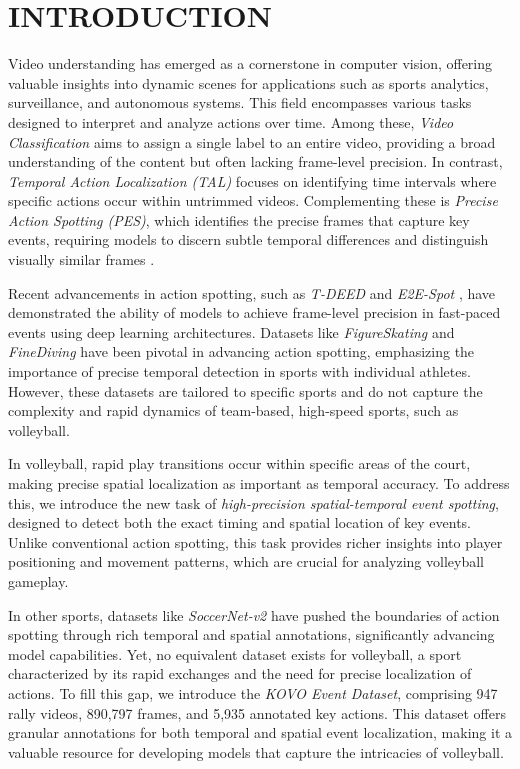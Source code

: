 \documentclass[a4paper,twoside]{article}
\begin{document}
\section{\uppercase{Introduction}}
\label{sec:introduction}
Video understanding has emerged as a cornerstone in computer vision, offering valuable insights into dynamic scenes for applications such as sports analytics, surveillance, and autonomous systems. This field encompasses various tasks designed to interpret and analyze actions over time. Among these, \textit{Video Classification} aims to assign a single label to an entire video, providing a broad understanding of the content but often lacking frame-level precision. In contrast, \textit{Temporal Action Localization (TAL)} focuses on identifying time intervals where specific actions occur within untrimmed videos. Complementing these is \textit{Precise Action Spotting (PES)}, which identifies the precise frames that capture key events, requiring models to discern subtle temporal differences and distinguish visually similar frames \cite{spot22}.

Recent advancements in action spotting, such as \textit{T-DEED} \cite{tdeed23} and \textit{E2E-Spot} \cite{spot22}, have demonstrated the ability of models to achieve frame-level precision in fast-paced events using deep learning architectures. Datasets like \textit{FigureSkating} \cite{figureskating} and \textit{FineDiving} \cite{finediving} have been pivotal in advancing action spotting, emphasizing the importance of precise temporal detection in sports with individual athletes. However, these datasets are tailored to specific sports and do not capture the complexity and rapid dynamics of team-based, high-speed sports, such as volleyball.

In volleyball, rapid play transitions occur within specific areas of the court, making precise spatial localization as important as temporal accuracy. To address this, we introduce the new task of \textit{high-precision spatial-temporal event spotting}, designed to detect both the exact timing and spatial location of key events. Unlike conventional action spotting, this task provides richer insights into player positioning and movement patterns, which are crucial for analyzing volleyball gameplay.

In other sports, datasets like \textit{SoccerNet-v2} \cite{soccernetv2} have pushed the boundaries of action spotting through rich temporal and spatial annotations, significantly advancing model capabilities. Yet, no equivalent dataset exists for volleyball, a sport characterized by its rapid exchanges and the need for precise localization of actions. To fill this gap, we introduce the \textit{KOVO Event Dataset}, comprising 947 rally videos, 890,797 frames, and 5,935 annotated key actions. This dataset offers granular annotations for both temporal and spatial event localization, making it a valuable resource for developing models that capture the intricacies of volleyball.
\end{document}
